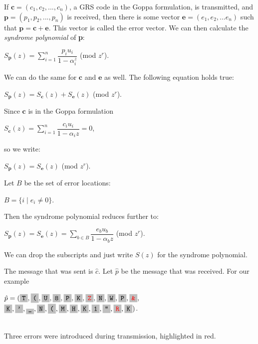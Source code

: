 \documentclass{article}
\begin{document}
If $\textbf{c} = (c_{1},c_{2},...,c_{n})$, a GRS code in the Goppa formulation, is transmitted, and $\textbf{p} = (p_{1},p_{2},...,p_{n})$ is received, then there is some vector $\textbf{e} = (e_{1},e_{2},...e_{n})$ such that $\textbf{p} = \textbf{c} + \textbf{e}$. This vector is called the error vector. We can then calculate the \textit{syndrome polynomial} of \textbf{p}:
\begin{center}
$S_{\textbf{p}}(z) = \sum\limits_{i=1}^{n} \dfrac{p_{i}u_{i}}{1 - \alpha_{i}^{z}}$ (mod $z^{r}$).
\end{center}
We can do the same for $\textbf{c}$ and $\textbf{e}$ as well. The following equation holds true:
\begin{center}
$S_{\textbf{p}}(z) = S_{\textbf{c}}(z) + S_{\textbf{e}}(z)$ (mod $z^{r}$).
\end{center}
Since $\textbf{c}$ is in the Goppa formulation
\begin{center}
$S_{\textbf{c}}(z) = \sum\limits_{i = 1}^{n} \dfrac{c_{i}u_{i}}{1 - \alpha_{i}z} = 0$,
\end{center}
so we write:
\begin{center}
$S_{\textbf{p}}(z) = S_{\textbf{e}}(z)$ (mod $z^{r}$).
\end{center}
Let $B$ be the set of error locations:
\begin{center}
$B =  \{i \mid e_{i} \neq 0\}$.
\end{center}
Then the syndrome polynomial reduces further to:
\begin{center}
$S_{\textbf{p}}(z) = S_{\textbf{e}}(z) = \sum\limits_{b \in B} \dfrac{e_{b}u_{b}}{1 - \alpha_{b}z} $ (mod $z^{r}$).
\end{center}
We can drop the subscripts and just write $S(z)$ for the syndrome polynomial.

The message that was sent is $\hat{c}$. Let $\hat{p}$ be the message that was received. For our example
\begin{center}
$\hat{p} = (\f{T}, \f{(}, \f{U}, \f{8}, \f{P}, \f{K}, \f{\textcolor{red}{Z}}, \f{N}, \f{W}, \f{P}, \f{\textcolor{red}{\&}}, $\\
    \hspace*{4.5ex}   $\f{K}, \f{'}, \f{\_}, \f{N}, \f{(}, \f{M}, \f{H}, \f{K}, \f{1}, \f{"}, \f{\textcolor{red}{R}}, \f{K})$.\\~\\
\end{center}
Three errors were introduced during transmission, highlighted in red.
\end{document}
